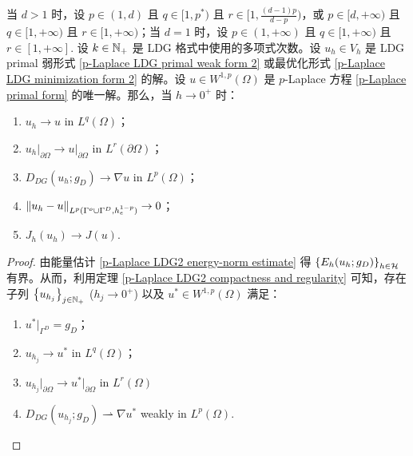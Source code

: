 \begin{theorem}
	当 \(d > 1\) 时，设 \(p \in (1, d)\) 且 \(q \in [1, p^{\ast})\) 且 \(r \in [1, \frac{(d-1)p}{d-p})\)，或 \(p \in [d, +\infty)\) 且 \(q \in [1, +\infty)\) 且 \(r \in [1, +\infty)\)；当 \(d = 1\) 时，设 \(p \in (1, +\infty)\) 且 \(q \in [1, +\infty)\) 且 \(r \in [1, +\infty]\). 设 \(k \in \mathbb{N}_+\) 是 LDG 格式中使用的多项式次数。设 \(u_{h} \in V_{h}\) 是 LDG primal 弱形式 \eqref{p-Laplace LDG primal weak form 2} 或最优化形式 \eqref{p-Laplace LDG minimization form 2} 的解。设 \(u \in W^{1,p}(\Omega)\) 是 \(p\)-Laplace 方程 \eqref{p-Laplace primal form} 的唯一解。那么，当 \(h \to 0^{+}\) 时：
	\begin{enumerate}
		\item \(u_{h} \to u\) in \(L^{q}(\Omega)\)；
		\item \(u_{h}\big|_{\partial\Omega} \to u\big|_{\partial\Omega}\) in \(L^{r}(\partial\Omega)\)；
		\item \(D_{DG}(u_{h}; g_{D}) \to \nabla u\) in \(L^{p}(\Omega)\)；
		\item \(\left\lVert u_{h} - u\right\rVert_{L^{p}(\Gamma^{o} \cup \Gamma^{D}, h_{e}^{1-p})} \to 0\)；
		\item \(J_{h}(u_{h}) \to J(u)\).
	\end{enumerate}

	\begin{proof}
		由能量估计 \ref{p-Laplace LDG2 energy-norm estimate} 得 \(\left\{E_{h}(u_{h}; g_{D})\right\}_{h \in \mathcal{H}}\) 有界。从而，利用定理 \ref{p-Laplace LDG2 compactness and regularity} 可知，存在子列 \(\left\{u_{h_{j}}\right\}_{j \in \mathbb{N}_+}\) (\(h_{j} \to 0^{+}\)) 以及 \(u^{\ast} \in W^{1,p}(\Omega)\) 满足：
		\begin{enumerate}
			\item \(u^{\ast} \big|_{\Gamma^{D}} = g_{D}\)；
			\item \(u_{h_{j}} \to u^{\ast}\) in \(L^{q}(\Omega)\)；
			\item \(u_{h_{j}}\big|_{\partial\Omega} \to u^{\ast}\big|_{\partial\Omega}\) in \(L^{r}(\Omega)\)
			\item \(D_{DG}(u_{h_{j}}; g_{D}) \rightharpoonup \nabla u^{\ast}\) weakly in \(L^{p}(\Omega)\).
		\end{enumerate}


\end{proof}
\end{theorem}
